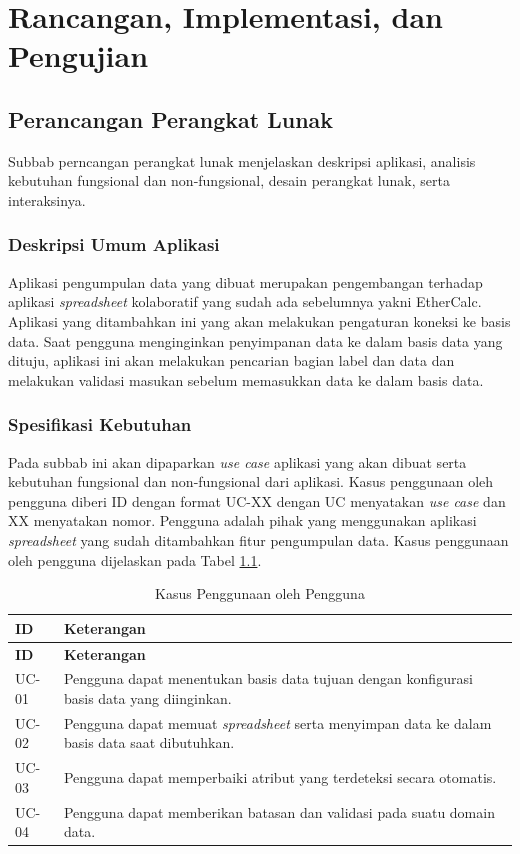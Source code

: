 \chapter{Rancangan, Implementasi, dan Pengujian}

\section{Perancangan Perangkat Lunak}
Subbab perncangan perangkat lunak menjelaskan deskripsi aplikasi, analisis kebutuhan fungsional dan non-fungsional, desain perangkat lunak, serta interaksinya.

	\subsection{Deskripsi Umum Aplikasi}
	Aplikasi pengumpulan data yang dibuat merupakan pengembangan terhadap aplikasi \textit{spreadsheet} kolaboratif yang sudah ada sebelumnya yakni EtherCalc. Aplikasi yang ditambahkan ini yang akan melakukan pengaturan koneksi ke basis data. Saat pengguna menginginkan penyimpanan data ke dalam basis data yang dituju, aplikasi ini akan melakukan pencarian bagian label dan data dan melakukan validasi masukan sebelum memasukkan data ke dalam basis data. 

	\subsection{Spesifikasi Kebutuhan}
	Pada subbab ini akan dipaparkan \textit{use case} aplikasi yang akan dibuat serta kebutuhan fungsional dan non-fungsional dari aplikasi. Kasus penggunaan oleh pengguna diberi ID dengan format UC-XX dengan UC menyatakan \textit{use case} dan XX menyatakan nomor. Pengguna adalah pihak yang menggunakan aplikasi \textit{spreadsheet} yang sudah ditambahkan fitur pengumpulan data. Kasus penggunaan oleh pengguna dijelaskan pada Tabel \ref{KebutuhanPengguna}.

	\begin{longtable}{ | p{2cm} | p{10cm} | }
	    \caption{Kasus Penggunaan oleh Pengguna}
	    \label{KebutuhanPengguna}\\ \hline
	    \centering\bfseries{ID} & \centering\bfseries{Keterangan} \tabularnewline \hline
	    \endfirsthead
	    \hline
	    \centering\bfseries{ID} & \centering\bfseries{Keterangan} \tabularnewline \hline
	    \endhead
	    UC-01 & Pengguna dapat menentukan basis data tujuan dengan konfigurasi basis data yang diinginkan. \\ \hline
	    UC-02 & Pengguna dapat memuat \textit{spreadsheet} serta menyimpan data ke dalam basis data saat dibutuhkan. \\ \hline
	    UC-03 & Pengguna dapat memperbaiki atribut yang terdeteksi secara otomatis. \\ \hline
	    UC-04 & Pengguna dapat memberikan batasan dan validasi pada suatu domain data. \\ \hline
	\end{longtable}


